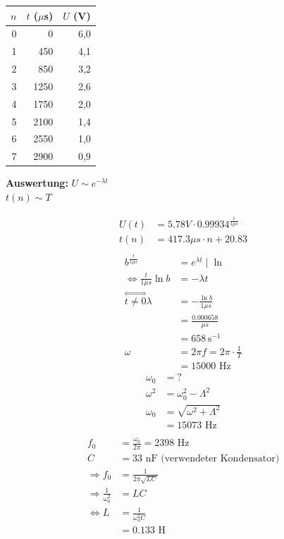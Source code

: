 \documentclass{article}
\begin{document}
	\begin{center}
		\begin{tabular}{|r|r|r|}
			\hline
			$n$ & $t$ ($\mu$s) & $U$ (V) \\
			\hline
			0 & 0    & 6{,}0 \\
			1 & 450  & 4{,}1 \\
			2 & 850  & 3{,}2 \\
			3 & 1250 & 2{,}6 \\
			4 & 1750 & 2{,}0 \\
			5 & 2100 & 1{,}4 \\
			6 & 2550 & 1{,}0 \\
			7 & 2900 & 0{,}9 \\
			\hline
		\end{tabular}
	\end{center}

	\newpage
	\noindent
	\textbf{Auswertung:}
	$U \sim e^{- \lambda t}$\\
	$ t (n) \sim T$

	\begin{align*}
		U(t) &= 5.78 V \cdot 0.99934^{\frac{t}{1 \mu s}}\\
		t(n) &= 417.3 \mu s \cdot n + 20.83\\
	\end{align*}
	\begin{align*}
		b^{\frac{t}{1 \mu s}} &= e^{\lambda t} \mid \ln\\
		\Leftrightarrow \frac{t}{1 \mu s} \ln b &= - \lambda t\\
		\overset{\Leftrightarrow}{t \neq 0} \lambda &= - \frac{\ln b}{1 \mu s}\\
		&= \frac{0.000658}{\mu s}\\
		&= 658 \, \mathrm{s}^{-1} \\
		\omega &= 2 \pi f = 2 \pi \cdot \frac{1}{T}\\
		       &= 15000 \text{ Hz}
	\end{align*}
	\begin{align*}
		\omega_0 &= ?\\
		\omega^2 &= \omega_0^2 - \Lambda^2\\
		\omega_0 &= \sqrt{\omega^2 + \Lambda^2 }\\
		&= 15073 \text{ Hz}\\
	\end{align*}
	\begin{align*}
		f_0 &= \frac{\omega_0}{2 \pi} = 2398 \text{ Hz}\\
		C &= 33 \text{ nF  (verwendeter Kondensator)}\\
		\Rightarrow f_0 &= \frac{1}{2 \pi \sqrt{L C}}\\
		\Rightarrow \frac{1}{\omega_0^2} &= L C\\
		\Leftrightarrow L &= \frac{1}{\omega_0^2 C}\\
		&= 0.133 \text{ H}\\
	\end{align*}
\end{document}
